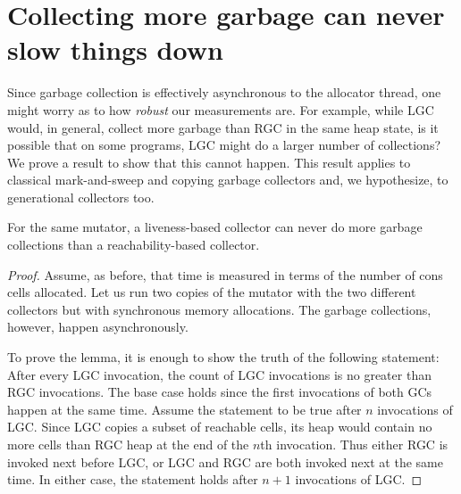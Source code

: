 \section{Collecting more garbage can never slow things down}
\label{sec:lgc-always-better}
Since garbage collection is  effectively asynchronous to the allocator
thread, one might  worry as to how {\em  robust} our measurements are.
For example,  while LGC would,  in general, collect more  garbage than
RGC in the same heap state,  is it possible that on some programs, LGC
might do  a larger number  of collections? We  prove a result  to show
that   this  cannot   happen.    This  result   applies  to   classical
mark-and-sweep and copying garbage  collectors and, we hypothesize, to
generational collectors too.

\begin{lemma}
For the  same mutator,  a liveness-based collector  can never  do more
garbage collections than a reachability-based collector.
\end{lemma}
 
\begin{proof}Assume, as before,  that time is measured in terms of the number of
  cons cells allocated. Let us run  two copies of the mutator with the
  two    different   collectors    but    with   synchronous    memory
  allocations.   The   garbage    collections,   however,   happen
  asynchronously.

  To prove the lemma, it is enough to show the truth of the following 
statement: After
 every  LGC invocation,  the count of LGC invocations   is  no greater
than  RGC invocations.   The  base case  holds  since the  first
invocations of both GCs happen at the same time.  Assume the statement
to be true after $n$ invocations of LGC.  Since LGC copies a subset of
reachable cells, its heap would contain no more cells than RGC heap at
the end  of the $n$th invocation.   Thus either RGC  is invoked next before
LGC, or LGC and RGC are both invoked next at the same time.  In either
case, the statement holds after $n+1$ invocations of LGC.
\end{proof}




